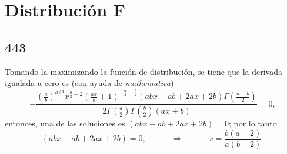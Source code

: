 \section{Distribución F}
\subsection*{443}
Tomando la maximizando la función de distribución, se tiene que la derivada igualada a cero es (con ayuda de \textit{mathematica})
	$$ -\frac{\left(\frac{a}{b}\right)^{a/2} x^{\frac{a}{2}-2} \left(\frac{a x}{b}+1\right)^{-\frac{a}{2}-\frac{b}{2}} (a b x-a b+2 a x+2 b) \Gamma \left(\frac{a+b}{2}\right)}{2 \Gamma \left(\frac{a}{2}\right) \Gamma \left(\frac{b}{2}\right) (a x+b)}=0, $$
entonces, una de las soluciones es $(a b x-a b+2 a x+2 b)=0$; por lo tanto
	$$ (a b x-a b+2 a x+2 b) = 0, \quad \quad \quad \Rightarrow \quad \quad \quad x = \frac{b(a - 2)}{a(b + 2)}. $$





















